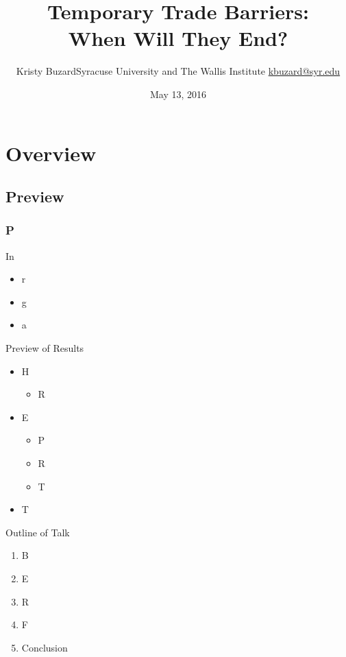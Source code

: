 \documentclass[handout]{beamer}
\title[Temporary Trade Barriers: When Will They End?\hspace{2.15in}\insertframenumber/\inserttotalframenumber]{Temporary Trade Barriers: \\ When Will They End?}
\author[Kristy Buzard]{\texorpdfstring{Kristy Buzard\newline Syracuse University and The Wallis Institute  \newline\url{kbuzard@syr.edu}}{Kristy Buzard}}
\date{May 13, 2016}
\begin{document}
\maketitle




\section{Overview}
\subsection{Preview}
\begin{frame}
\frametitle{P}
In 
\pause
\begin{itemize}[<+->]
	\item r
  \item g
	\item a
\end{itemize}
\end{frame}


\begin{frame}{Preview of Results}
\begin{itemize}[<+->]
	\item H
		\begin{itemize}
			\item R
		\end{itemize}
	\item E
		\begin{itemize}
			\item P
			\item R
			\item T
		\end{itemize}
	\item T
\end{itemize}
\end{frame}

\begin{frame}{Outline of Talk}
\begin{enumerate}[<+->]
	\item B
	\item E
	\item R
	\item F
	\item Conclusion
\end{enumerate}
\end{frame}
\end{document}
